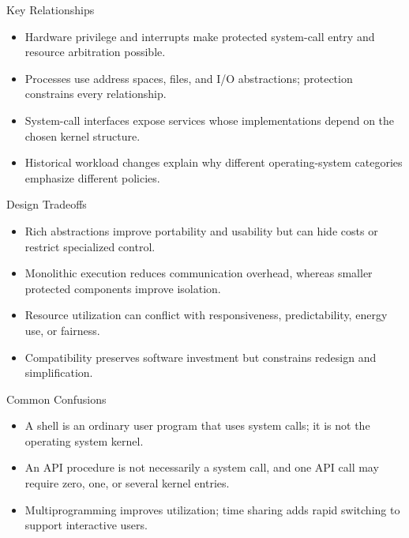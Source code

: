 \documentclass[10pt,letterpaper]{article}
\begin{document}
\begin{studybox}{Key Relationships}
\begin{itemize}
  \item Hardware privilege and interrupts make protected system-call entry and resource arbitration possible.
  \item Processes use address spaces, files, and I/O abstractions; protection constrains every relationship.
  \item System-call interfaces expose services whose implementations depend on the chosen kernel structure.
  \item Historical workload changes explain why different operating-system categories emphasize different policies.
\end{itemize}
\end{studybox}

\begin{studybox}{Design Tradeoffs}
\begin{itemize}
  \item Rich abstractions improve portability and usability but can hide costs or restrict specialized control.
  \item Monolithic execution reduces communication overhead, whereas smaller protected components improve isolation.
  \item Resource utilization can conflict with responsiveness, predictability, energy use, or fairness.
  \item Compatibility preserves software investment but constrains redesign and simplification.
\end{itemize}
\end{studybox}

\begin{studybox}{Common Confusions}
\begin{itemize}
  \item A shell is an ordinary user program that uses system calls; it is not the operating system kernel.
  \item An API procedure is not necessarily a system call, and one API call may require zero, one, or several kernel entries.
  \item Multiprogramming improves utilization; time sharing adds rapid switching to support interactive users.
\end{itemize}
\end{studybox}
\end{document}
